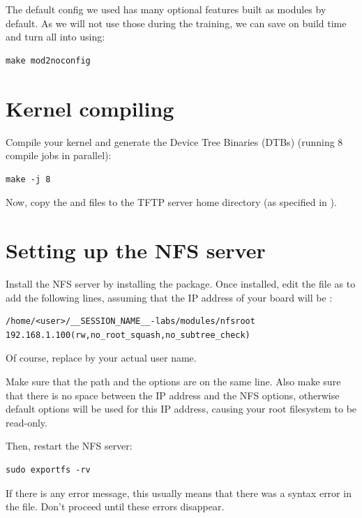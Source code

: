 The default config we used has many optional features built as modules
by default. As we will not use those during the training, we can save
on build time and turn all  into  using:

\begin{verbatim}
make mod2noconfig
\end{verbatim}

\section{Kernel compiling}

Compile your kernel and generate the Device Tree Binaries (DTBs)
(running 8 compile jobs in parallel):

\begin{verbatim}
make -j 8
\end{verbatim}

Now, copy the  and  files to the
TFTP server home directory (as specified in ).

\section{Setting up the NFS server}

Install the NFS server by installing the 
package. Once installed, edit the  file as
 to add the following lines, assuming that the IP address
of your board will be :

\scriptsize
\begin{verbatim}
/home/<user>/__SESSION_NAME__-labs/modules/nfsroot 192.168.1.100(rw,no_root_squash,no_subtree_check)
\end{verbatim}
\normalsize

Of course, replace  by your actual user name.

Make sure that the path and the options are on the same line.
Also make sure that there is no space between the IP address and the NFS
options, otherwise default options will be used for this IP address,
causing your root filesystem to be read-only.

Then, restart the NFS server:

\begin{verbatim}
sudo exportfs -rv
\end{verbatim}

If there is any error message, this usually means that there was a
syntax error in the  file. Don't proceed until these
errors disappear.

